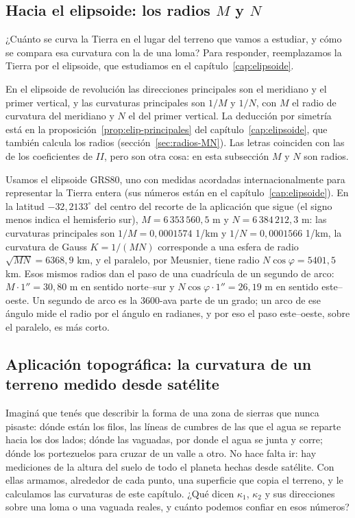 \subsection{Hacia el elipsoide: los radios \texorpdfstring{\(M\)}{M} y \texorpdfstring{\(N\)}{N}}

¿Cuánto se curva la Tierra en el lugar del terreno que vamos a estudiar, y cómo se compara esa
curvatura con la de una loma? Para responder, reemplazamos la Tierra por el elipsoide, que
estudiamos en el capítulo~\ref{cap:elipsoide}.

En el elipsoide de revolución las direcciones principales son el meridiano y el primer
vertical, y las curvaturas principales son \(1/M\) y \(1/N\), con \(M\) el radio de curvatura
del meridiano y \(N\) el del primer vertical. La deducción por simetría está en la
proposición~\ref{prop:elip-principales} del capítulo~\ref{cap:elipsoide}, que también calcula
los radios (sección~\ref{sec:radios-MN}). Las
letras coinciden con las de los coeficientes de \(II\), pero son otra cosa: en esta subsección
\(M\) y \(N\) son radios.

Usamos el elipsoide GRS80, uno con medidas acordadas internacionalmente para representar la
Tierra entera (sus números están en el capítulo~\ref{cap:elipsoide}).
En la latitud \(-32{,}2133^\circ\) del centro del recorte de la
aplicación que sigue (el signo menos indica el hemisferio sur), \(M=6\,353\,560{,}5\) m y \(N=6\,384\,212{,}3\) m: las curvaturas
principales son \(1/M=0{,}0001574\) 1/km y \(1/N=0{,}0001566\) 1/km, la curvatura de Gauss
\(K=1/(MN)\) corresponde a una esfera de radio \(\sqrt{MN}=6368{,}9\) km, y el paralelo, por
Meusnier, tiene radio \(N\cos\varphi=5401{,}5\) km. Esos mismos radios dan el paso de una
cuadrícula de un segundo de arco: \(M\cdot1''=30{,}80\) m en sentido norte--sur y
\(N\cos\varphi\cdot1''=26{,}19\) m en sentido este--oeste. Un segundo de arco es la 3600-ava
parte de un grado; un arco de ese ángulo mide el radio por el ángulo en radianes, y por eso el
paso este--oeste, sobre el paralelo, es más corto.

\subsection{Aplicación topográfica: la curvatura de un terreno medido desde satélite}

Imaginá que tenés que describir la forma de una zona de sierras que nunca pisaste: dónde están
los filos, las líneas de cumbres de las que el agua se reparte hacia los dos lados; dónde las
vaguadas, por donde el agua se junta y corre; dónde los portezuelos para cruzar de un valle a
otro. No hace falta ir: hay mediciones de la altura del suelo de todo el planeta hechas desde
satélite. Con ellas armamos, alrededor de cada punto, una superficie que copia el terreno, y le
calculamos las curvaturas de este capítulo. ¿Qué dicen \(\kappa_1\), \(\kappa_2\) y sus
direcciones sobre una loma o una vaguada reales, y cuánto podemos confiar en esos números?

